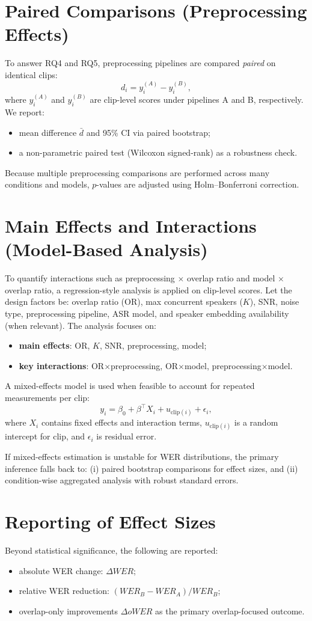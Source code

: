 \section{Paired Comparisons (Preprocessing Effects)}
To answer RQ4 and RQ5, preprocessing pipelines are compared \emph{paired} on identical clips:
\[
d_i = y_i^{(A)} - y_i^{(B)} ,
\]
where $y_i^{(A)}$ and $y_i^{(B)}$ are clip-level scores under pipelines A and B, respectively.
We report:
\begin{itemize}
  \item mean difference $\bar{d}$ and 95\% CI via paired bootstrap;
  \item a non-parametric paired test (Wilcoxon signed-rank) as a robustness check.
\end{itemize}
Because multiple preprocessing comparisons are performed across many conditions and models,
$p$-values are adjusted using Holm--Bonferroni correction.

\section{Main Effects and Interactions (Model-Based Analysis)}
To quantify interactions such as preprocessing $\times$ overlap ratio and model $\times$ overlap ratio,
a regression-style analysis is applied on clip-level scores. Let the design factors be:
overlap ratio (OR), max concurrent speakers ($K$), SNR, noise type, preprocessing pipeline, ASR model,
and speaker embedding availability (when relevant). The analysis focuses on:
\begin{itemize}
  \item \textbf{main effects}: OR, $K$, SNR, preprocessing, model;
  \item \textbf{key interactions}: OR$\times$preprocessing, OR$\times$model, preprocessing$\times$model.
\end{itemize}

A mixed-effects model is used when feasible to account for repeated measurements per clip:
\[
y_{i} = \beta_0 + \beta^\top X_i + u_{\text{clip}(i)} + \epsilon_i,
\]
where $X_i$ contains fixed effects and interaction terms, $u_{\text{clip}(i)}$ is a random intercept for clip,
and $\epsilon_i$ is residual error.

If mixed-effects estimation is unstable for WER distributions, the primary inference falls back to:
(i) paired bootstrap comparisons for effect sizes, and
(ii) condition-wise aggregated analysis with robust standard errors.

\section{Reporting of Effect Sizes}
Beyond statistical significance, the following are reported:
\begin{itemize}
  \item absolute WER change: $\Delta WER$;
  \item relative WER reduction: $(WER_B - WER_A)/WER_B$;
  \item overlap-only improvements $\Delta oWER$ as the primary overlap-focused outcome.
\end{itemize}

